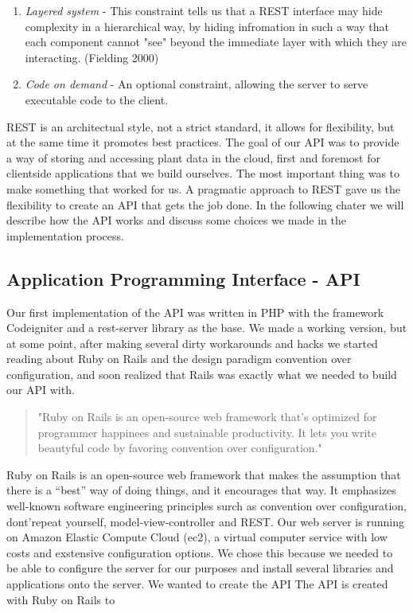 \begin{enumerate}
\item{} \emph{Layered system} - This constraint tells us that a REST interface may hide complexity in a hierarchical way, by hiding infromation in such a way that each component cannot "see" beyond the immediate layer with which they are interacting. (Fielding 2000)

\item{} \emph{Code on demand} - An optional constraint, allowing the server to serve executable code to the client. 

\end{enumerate}

REST is an architectual style, not a strict standard, it allows for flexibility, but at the same time it promotes best practices. The goal of our API was to provide a way of storing and accessing plant data in the cloud, first and foremost for clientside applications that we build ourselves. The most important thing was to make something that worked for us. A pragmatic approach to REST gave us the flexibility to create an API that gets the job done. In the following chater we will describe how the API works and discuss some choices we made in the implementation process.

\subsection{Application Programming Interface - API}
Our first implementation of the API was written in PHP with the framework Codeigniter and a rest-server library as the base. We made a working version, but at some point, after making several dirty workarounds and hacks we started reading about Ruby on Rails and the design paradigm convention over configuration, and soon realized that Rails was exactly what we needed to build our API with.

\begin{quote}
"Ruby on Rails is an open-source web framework that’s optimized for programmer happinees and sustainable productivity. It lets you write beautyful code by favoring convention over configuration."\citep{rubyonrails.org} 
\end{quote}

Ruby on Rails is an open-source web framework that makes the assumption that there is a “best” way of doing things, and it encourages that way. It emphasizes well-known software engineering principles surch as convention over configuration, dont’repeat yourself, model-view-controller and REST.
 Our web server is running on Amazon Elastic Compute Cloud (ec2), a virtual computer service with low costs and exstensive configuration options. We chose this because we needed to be able to configure the server for our purposes and install several libraries and applications onto the server. We wanted to create the API The API is created with Ruby on Rails to 

